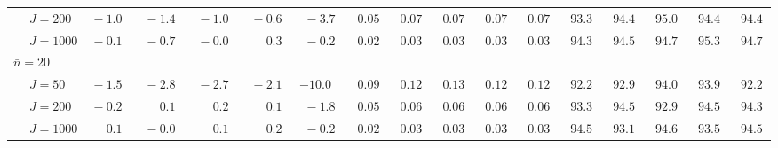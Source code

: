 \begin{sidewaystable}
\begin{threeparttable}
\begin{tabular}{llccccccccccccccc}
 & \nopagebreak $\;J=200$  & $\phantom{0}{-}1.0\phantom{0}$ & $\phantom{0}{-}1.4\phantom{0}$ & $\phantom{0}{-}1.0\phantom{0}$ & $\phantom{0}{-}0.6\phantom{0}$ & $\phantom{0}{-}3.7\phantom{0}$ & $\phantom{0}0.05\phantom{0}$ & $\phantom{0}0.07\phantom{0}$ & $\phantom{0}0.07\phantom{0}$ & $\phantom{0}0.07\phantom{0}$ & $\phantom{0}0.07\phantom{0}$ & $\phantom{0}93.3\phantom{0}$ & $\phantom{0}94.4\phantom{0}$ & $\phantom{0}95.0\phantom{0}$ & $\phantom{0}94.4\phantom{0}$ & $\phantom{0}94.4\phantom{0}$ \\
 & \nopagebreak $\;J=1000$  & $\phantom{0}{-}0.1\phantom{0}$ & $\phantom{0}{-}0.7\phantom{0}$ & $\phantom{0}{-}0.0\phantom{0}$ & $\phantom{0}\phantom{-}0.3\phantom{0}$ & $\phantom{0}{-}0.2\phantom{0}$ & $\phantom{0}0.02\phantom{0}$ & $\phantom{0}0.03\phantom{0}$ & $\phantom{0}0.03\phantom{0}$ & $\phantom{0}0.03\phantom{0}$ & $\phantom{0}0.03\phantom{0}$ & $\phantom{0}94.3\phantom{0}$ & $\phantom{0}94.5\phantom{0}$ & $\phantom{0}94.7\phantom{0}$ & $\phantom{0}95.3\phantom{0}$ & $\phantom{0}94.7\phantom{0}$ \\
\multicolumn{4}{l}{$\bar{n}=20$} \\  & \nopagebreak $\;J=50$  & $\phantom{0}{-}1.5\phantom{0}$ & $\phantom{0}{-}2.8\phantom{0}$ & $\phantom{0}{-}2.7\phantom{0}$ & $\phantom{0}{-}2.1\phantom{0}$ & ${-}10.0\phantom{0}$ & $\phantom{0}0.09\phantom{0}$ & $\phantom{0}0.12\phantom{0}$ & $\phantom{0}0.13\phantom{0}$ & $\phantom{0}0.12\phantom{0}$ & $\phantom{0}0.12\phantom{0}$ & $\phantom{0}92.2\phantom{0}$ & $\phantom{0}92.9\phantom{0}$ & $\phantom{0}94.0\phantom{0}$ & $\phantom{0}93.9\phantom{0}$ & $\phantom{0}92.2\phantom{0}$ \\
 & \nopagebreak $\;J=200$  & $\phantom{0}{-}0.2\phantom{0}$ & $\phantom{0}\phantom{-}0.1\phantom{0}$ & $\phantom{0}\phantom{-}0.2\phantom{0}$ & $\phantom{0}\phantom{-}0.1\phantom{0}$ & $\phantom{0}{-}1.8\phantom{0}$ & $\phantom{0}0.05\phantom{0}$ & $\phantom{0}0.06\phantom{0}$ & $\phantom{0}0.06\phantom{0}$ & $\phantom{0}0.06\phantom{0}$ & $\phantom{0}0.06\phantom{0}$ & $\phantom{0}93.3\phantom{0}$ & $\phantom{0}94.5\phantom{0}$ & $\phantom{0}92.9\phantom{0}$ & $\phantom{0}94.5\phantom{0}$ & $\phantom{0}94.3\phantom{0}$ \\
 & \nopagebreak $\;J=1000$  & $\phantom{0}\phantom{-}0.1\phantom{0}$ & $\phantom{0}{-}0.0\phantom{0}$ & $\phantom{0}\phantom{-}0.1\phantom{0}$ & $\phantom{0}\phantom{-}0.2\phantom{0}$ & $\phantom{0}{-}0.2\phantom{0}$ & $\phantom{0}0.02\phantom{0}$ & $\phantom{0}0.03\phantom{0}$ & $\phantom{0}0.03\phantom{0}$ & $\phantom{0}0.03\phantom{0}$ & $\phantom{0}0.03\phantom{0}$ & $\phantom{0}94.5\phantom{0}$ & $\phantom{0}93.1\phantom{0}$ & $\phantom{0}94.6\phantom{0}$ & $\phantom{0}93.5\phantom{0}$ & $\phantom{0}94.5\phantom{0}$ \\

\end{tabular}
\end{threeparttable}
\end{sidewaystable}
